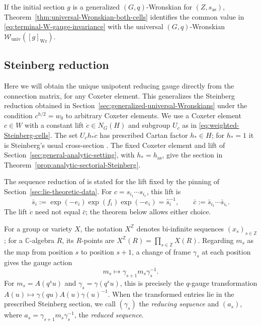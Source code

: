 \documentclass[11pt,leqno]{amsart}
\numberwithin{equation}{section}
\theoremstyle{plain}
\theoremstyle{definition}
\theoremstyle{plain}
\theoremstyle{definition}
\theoremstyle{remark}
\begin{document}
If the initial section $g$ is a generalized $(G,q)$-Wronskian for $(Z,s_{\mathrm{as}})$, Theorem~\ref{thm:universal-Wronskian-both-cells} identifies the common value in \eqref{eq:terminal-W-gauge-invariance} with the universal $(G,q)$-Wronskian $\mathscr W_{\mathrm{univ}}([g]_{\mathrm{Wr}})$.

\subsection{Steinberg reduction}\label{sec:difference-field-Steinberg}
Here we will obtain the unique unipotent reducing gauge directly from the connection matrix, for any Coxeter element. This generalizes the Steinberg reduction obtained in Section~\ref{sec:generalized-universal-Wronskians} under the condition $c^{h/2}=w_0$ to arbitrary Coxeter elements. We use a Coxeter element $c\in W$ with a constant lift $\dot c\in N_G(H)$ and subgroup $U_c$ as in \eqref{eq:weighted-Steinberg-cells}.  The set $U_ch_*\dot c$ has prescribed Cartan factor $h_*\in H$; for $h_*=1$ it is Steinberg's usual cross-section \cite{Steinberg1965}.  The fixed Coxeter element and lift of Section~\ref{sec:general-analytic-setting}, with $h_*=h_{\mathrm{as}}$, give the section in Theorem~\ref{prop:analytic-sectorial-Steinberg}.

The sequence reduction of \cite{FL2025} is stated for the lift fixed by the pinning of Section~\ref{sec:lie-theoretic-data}. For $c=s_{i_1}\cdots s_{i_r}$, this lift is
\begin{equation}\label{eq:pinned-Coxeter-lift}
 \bar s_i:=\exp(-e_i)\exp(f_i)\exp(-e_i)=\widehat s_i^{-1},
 \qquad \bar c:=\bar s_{i_1}\cdots\bar s_{i_r}.
\end{equation}
The lift $\dot c$ need not equal $\bar c$; the theorem below allows either choice.

For a group or variety $X$, the notation $X^{\mathbb Z}$ denotes bi-infinite sequences $(x_s)_{s\in\mathbb Z}$; for a $\mathbb C$-algebra $R$, its $R$-points are $X^{\mathbb Z}(R)=\prod_{s\in\mathbb Z}X(R)$.  Regarding $m_s$ as the map from position $s$ to position $s+1$, a change of frame $\gamma_s$ at each position gives the gauge action
\[
 m_s\longmapsto\gamma_{s+1}m_s\gamma_s^{-1}.
\]
For $m_s=A(q^su)$ and $\gamma_s=\gamma(q^su)$, this is precisely the $q$-gauge transformation $A(u)\mapsto\gamma(qu)A(u)\gamma(u)^{-1}$.  When the transformed entries lie in the prescribed Steinberg section, we call $(\gamma_s)$ the \emph{reducing sequence} and $(a_s)$, where $a_s=\gamma_{s+1}m_s\gamma_s^{-1}$, the \emph{reduced sequence}.
\end{document}
